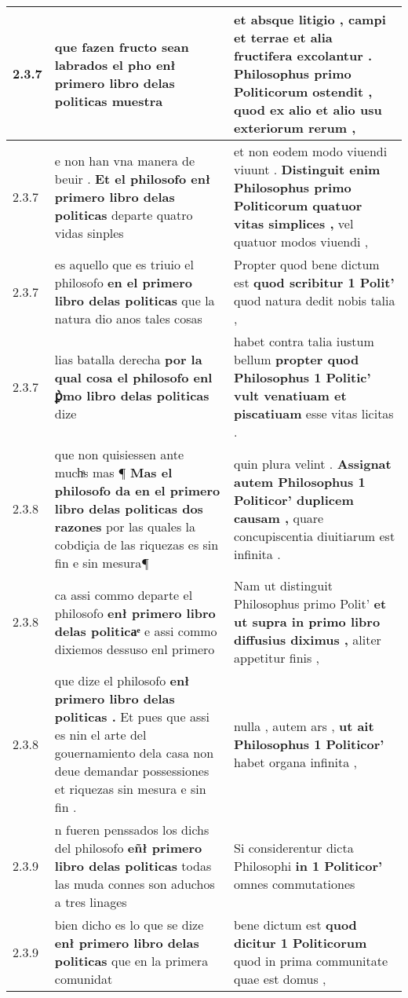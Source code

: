 \begin{tabular}{|p{1cm}|p{6.5cm}|p{6.5cm}|}
2.3.7 & que fazen fructo sean labrados \textbf{ el pho enł primero libro delas politicas } muestra & et absque litigio , campi et terrae et alia fructifera excolantur . \textbf{ Philosophus primo Politicorum ostendit , } quod ex alio et alio usu exteriorum rerum , \\\hline
2.3.7 & e non han vna manera de beuir . \textbf{ Et el philosofo enł primero libro delas politicas } departe quatro vidas sinples & et non eodem modo viuendi viuunt . \textbf{ Distinguit enim Philosophus primo Politicorum quatuor vitas simplices , } vel quatuor modos viuendi , \\\hline
2.3.7 & es aquello que es triuio el philosofo \textbf{ en el primero libro delas politicas } que la natura dio anos tales cosas & Propter quod bene dictum est \textbf{ quod scribitur 1 Polit’ } quod natura dedit nobis talia , \\\hline
2.3.7 & lias batalla derecha \textbf{ por la qual cosa el philosofo enl ꝑ̀mo libro delas politicas } dize & habet contra talia iustum bellum \textbf{ propter quod Philosophus 1 Politic’ vult venatiuam et piscatiuam } esse vitas licitas . \\\hline
2.3.8 & que non quisiessen ante muchͣs mas ¶ \textbf{ Mas el philosofo da en el primero libro delas politicas dos razones } por las quales la cobdiçia de las riquezas es sin fin e sin mesura¶ & quin plura velint . \textbf{ Assignat autem Philosophus 1 Politicor’ duplicem causam , } quare concupiscentia diuitiarum est infinita . \\\hline
2.3.8 & ca assi commo departe el philosofo \textbf{ enł primero libro delas politicaͤ } e assi commo dixiemos dessuso enl primero & Nam ut distinguit Philosophus primo Polit’ \textbf{ et ut supra in primo libro diffusius diximus , } aliter appetitur finis , \\\hline
2.3.8 & que dize el philosofo \textbf{ enł primero libro delas politicas . } Et pues que assi es nin el arte del gouernamiento dela casa non deue demandar possessiones et riquezas sin mesura e sin fin . & nulla , autem ars , \textbf{ ut ait Philosophus 1 Politicor’ } habet organa infinita , \\\hline
2.3.9 & n fueren penssados los dichs del philosofo \textbf{ eñł primero libro delas politicas } todas las muda connes son aduchos a tres linages & Si considerentur dicta Philosophi \textbf{ in 1 Politicor’ } omnes commutationes \\\hline
2.3.9 & bien dicho es lo que se dize \textbf{ enł primero libro delas politicas } que en la primera comunidat & bene dictum est \textbf{ quod dicitur 1 Politicorum } quod in prima communitate quae est domus , \\\hline

\end{tabular}
